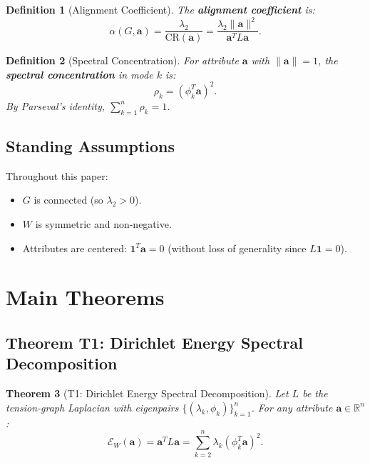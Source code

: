 \documentclass[12pt,letterpaper]{article}
\newtheorem{theorem}{Theorem}[section]
\newtheorem{definition}[theorem]{Definition}
\newcommand{\R}{\mathbb{R}}
\newcommand{\One}{\mathbf{1}}
\newcommand{\bfa}{\mathbf{a}}
\newcommand{\CR}{\mathrm{CR}}
\newcommand{\cE}{\mathcal{E}}
\begin{document}
\begin{definition}[Alignment Coefficient]
\label{def:alpha}
The \textbf{alignment coefficient} is:
\[
  \alpha(G, \bfa) = \frac{\lambda_2}{\CR(\bfa)} = \frac{\lambda_2 \|\bfa\|^2}{\bfa^T L \bfa}.
\]
\end{definition}

\begin{definition}[Spectral Concentration]
\label{def:rho}
For attribute $\bfa$ with $\|\bfa\| = 1$, the \textbf{spectral concentration} in mode $k$ is:
\[
  \rho_k = (\phi_k^T \bfa)^2.
\]
By Parseval's identity, $\sum_{k=1}^{n} \rho_k = 1$.
\end{definition}

\subsection{Standing Assumptions}
\label{sec:assumptions}

Throughout this paper:
\begin{itemize}
  \item[\textbf{(A1)}] $G$ is connected (so $\lambda_2 > 0$).
  \item[\textbf{(A2)}] $W$ is symmetric and non-negative.
  \item[\textbf{(A3)}] Attributes are centered: $\One^T \bfa = 0$ (without loss of generality since $L\One = 0$).
\end{itemize}

\section{Main Theorems}
\label{sec:theorems}

\subsection{Theorem T1: Dirichlet Energy Spectral Decomposition}

\begin{theorem}[T1: Dirichlet Energy Spectral Decomposition]
\label{thm:T1}
Let $L$ be the tension-graph Laplacian with eigenpairs $\{(\lambda_k, \phi_k)\}_{k=1}^n$. For any attribute $\bfa \in \R^n$:
\begin{equation}
\label{eq:T1}
  \cE_W(\bfa) = \bfa^T L \bfa = \sum_{k=2}^{n} \lambda_k (\phi_k^T \bfa)^2.
\end{equation}
\end{theorem}
\end{document}
